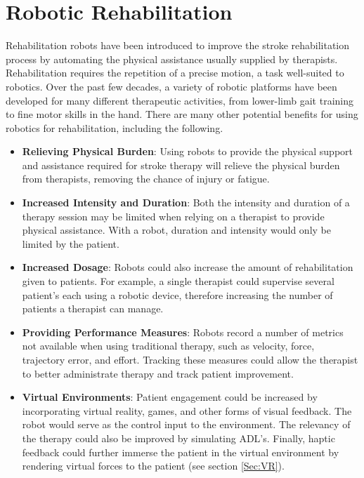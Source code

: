 \documentclass[12pt]{report}
\begin{document}


\section{Robotic Rehabilitation}

	Rehabilitation robots have been introduced to improve the stroke rehabilitation process by automating the physical assistance usually supplied by therapists. Rehabilitation requires the repetition of a precise motion, a task well-suited to robotics. Over the past few decades, a variety of robotic platforms have been developed for many different therapeutic activities, from lower-limb gait training to fine motor skills in the hand. There are many other potential benefits for using robotics for rehabilitation, including the following.
\begin{itemize}
	\item \textbf{Relieving Physical Burden}: Using robots to provide the physical support and assistance required for stroke therapy will relieve the physical burden from therapists, removing the chance of injury or fatigue.
	\item \textbf{Increased Intensity and Duration}: Both the intensity and duration of a therapy session may be limited when relying on a therapist to provide physical assistance. With a robot, duration and intensity would only be limited by the patient. 
	\item \textbf{Increased Dosage}: Robots could also increase the amount of rehabilitation given to patients. For example, a single therapist could supervise several patient's each using a robotic device, therefore increasing the number of patients a therapist can manage.
	\item \textbf{Providing Performance Measures}: Robots record a number of metrics not available when using traditional therapy, such as velocity, force, trajectory error, and effort. Tracking these measures could allow the therapist to better administrate therapy and track patient improvement. 
	\item \textbf{Virtual Environments}: Patient engagement could be increased by incorporating virtual reality, games, and other forms of visual feedback. The robot would serve as the control input to the environment. The relevancy of the therapy could also be improved by simulating ADL's. Finally, haptic feedback could further immerse the patient in the virtual environment by rendering virtual forces to the patient (see section \ref{Sec:VR}).
\end{itemize}
	
\end{document}

